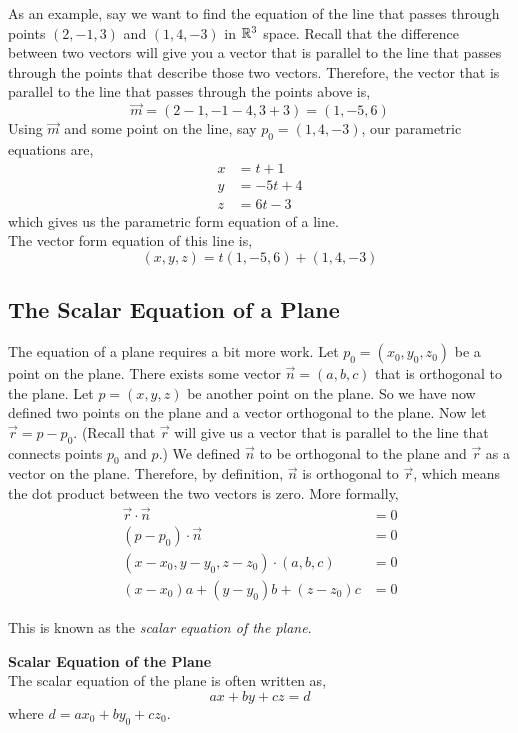 \documentclass[12pt]{article}
\begin{document}
 As an example, say we want to find the equation of the line that passes through points $(2,-1,3)$ and $(1,4,-3)$ in $\mathbb{R}^3$ space. Recall that the difference between two vectors will give you a vector that is parallel to the line that passes through the points that describe those two vectors. Therefore, the vector that is parallel to the line that passes through the points above is,
\[
\vec{m} = (2-1,-1-4,3+3) = (1,-5,6)
\]
Using $\vec{m}$ and some point on the line, say $p_0=(1,4,-3)$, our parametric equations are,
\begin{align*}
x &= t + 1\\
y &= -5t + 4\\
z &= 6t - 3
\end{align*}
which gives us the parametric form equation of a line.\\

The vector form equation of this line is,
\[
(x,y,z) = t(1,-5,6) + (1,4,-3)
\]

\subsection{The Scalar Equation of a Plane}

The equation of a plane requires a bit more work. Let $p_0=(x_0,y_0,z_0)$ be a point on the plane. There exists some vector $\vec{n}=(a,b,c)$ that is orthogonal to the plane. Let $p=(x,y,z)$ be another point on the plane. So we have now defined two points on the plane and a vector orthogonal to the plane. Now let $\vec{r}=p-p_0$. (Recall that $\vec{r}$ will give us a vector that is parallel to the line that connects points $p_0$ and $p$.) We defined $\vec{n}$ to be orthogonal to the plane and $\vec{r}$ as a vector on the plane. Therefore, by definition, $\vec{n}$ is orthogonal to $\vec{r}$, which means the dot product between the two vectors is zero. More formally,
\begin{align*}
\vec{r}\cdot\vec{n} &= 0 \\
(p-p_0)\cdot \vec{n} &=0 \\
(x-x_0,y-y_0,z-z_0) \cdot (a,b,c) &= 0 \\
(x-x_0)a + (y-y_0)b + (z-z_0)c &= 0 
\end{align*}

This is known as the \emph{scalar equation of the plane}. \\
 
\begin{framed}
\textbf{Scalar Equation of the Plane} \\
The scalar equation of the plane is often written as,
\[
ax + by + cz = d
\]
where $d = ax_0 + by_0 + cz_0$. \\
\end{framed}
\end{document}
